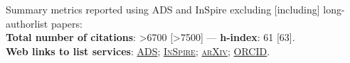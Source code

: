 Summary metrics reported using ADS and InSpire excluding [including] long-authorlist papers:
\\
\textcolor{mark_color}{\textbf{Total number of citations}}: >6700 [>7500]
 --- 
\textcolor{mark_color}{\textbf{h-index}}: 61 [63].
\\
\textcolor{mark_color}{\textbf{Web links to list services}}:
\href{https://davidegerosa.com/myads}{\textsc{ADS}};
\href{https://davidegerosa.com/myinspire}{\textsc{InSpire}};
\href{http://davidegerosa.com/myarxiv}{\textsc{arXiv}};
\href{https://davidegerosa.com/myorcid}{\textsc{ORCID}}.